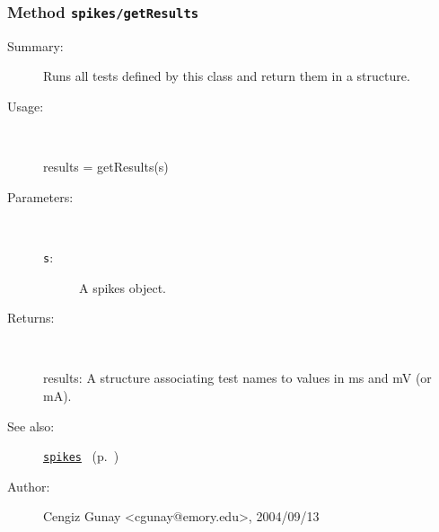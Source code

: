 \subsubsection[Method \texttt{getResults}]{Method \texttt{spikes/getResults}}%
%
\label{ref_spikes__getResults}%
\hypertarget{ref_spikes__getResults}{}%
\begin{description}
\item[Summary:]Runs all tests defined by this class and return them in a 
		structure.
%
\item[Usage:]~%
\begin{lyxcode}%
results = getResults(s)
%
\end{lyxcode}%
%
%
\item[Parameters:]~
\begin{description}%
\item[\texttt{s}:]
 A spikes object.
\end{description}%
%
\item[Returns:
]~

	results: A structure associating test names to values 
		in ms and mV (or mA).
%
%
\item[See also:]%
\hyperlink{ref_spikes}{\texttt{spikes}}%
\ (p.~\pageref{ref_spikes})%
%
%
\item[Author:]%
Cengiz Gunay <cgunay@emory.edu>, 2004/09/13
%
\end{description}
\methodline%

